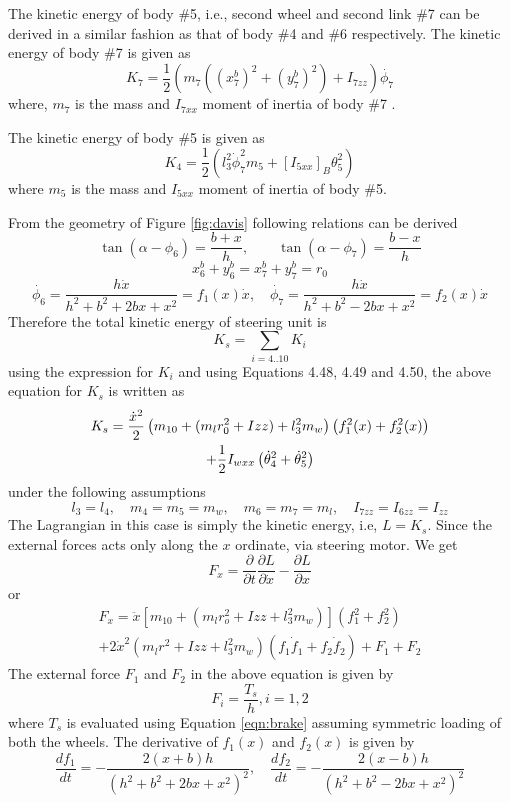 The kinetic energy of body \#5, i.e., second wheel and second link \#7 can be derived in a similar fashion as that of body \#4 and \#6 respectively. The kinetic energy of body \#7 is given as
\begin{equation}
K_7=\frac{1}{2}(m_7((x^b_7)^2+(y^b_7)^2)+I_{7zz})\dot{\phi_7}
\end{equation}
where, $m_7$ is the mass and  $I_{7xx}$ moment of inertia of body \#7 .

The kinetic energy of body \#5  is given as
 \begin{equation}
K_4=\frac{1}{2}(l_3^2\dot\phi_7^2m_5+[I_{5xx}]_B\theta_5^2)
\end{equation} 
 where $m_5$  is the mass and $I_{5xx}$ moment of inertia of body \#5.
 

From the geometry of Figure \ref{fig:davis} following relations can be derived 
\begin{equation}
\label{eqn:thetaTox}
\tan(\alpha-\phi_6)=\frac{b+x}{h}, \quad \quad \tan(\alpha-\phi_7)=\frac{b-x}{h}
\end{equation}
\begin{equation}
\label{ro}
x^b_6+y^b_6=x^b_7+y^b_7=r_0
\end{equation}
\begin{equation}
\dot{\phi_6}=\dfrac{h\dot x}{h^2+b^2+2bx+x^2}=f_1(x)\dot x,\quad \dot{\phi_7}=\dfrac{h\dot x}{h^2+b^2-2bx+x^2}=f_2(x)\dot x
\end{equation}
 Therefore the total kinetic energy of steering unit is 
\[K_s=\sum_{i=4..10}K_i\]
using the expression for $K_i$  and using Equations 4.48, 4.49 and 4.50, the above equation for $K_s$  is written as 
\begin{multline}
	K_s=\frac{\dot x^2}{2} \left( m_{10}+(m_l r^2_0+I{zz})+l^2_3m_w \right) \left(f^2_1(x)+f^2_2(x) \right)\\ + \frac{1}{2} I_{wxx}\left(\dot\theta^2_4  +\dot\theta^2_5\right)
\end{multline}
under the following assumptions \[l_3=l_4, \quad m_4=m_5=m_w, \quad m_6=m_7=m_l, \quad I_{7zz}=I_{6zz}=I_{zz}\]
The Lagrangian in this case is simply the kinetic energy, i.e,  $L=K_s$. Since the external forces acts only along the $x$ ordinate, via steering motor. We get
\[F_x= \dfrac{\partial}{\partial t}\dfrac{\partial L}{\partial \dot x} - \dfrac{\partial L}{\partial x}\]
or 
\begin{multline}
\label{eqn:SteerDyn}
F_x=\ddot{x}\left[ m_{10}+\left(m_lr_o^2+I{zz}+l^2_3m_w \right) \right] \left( f_1^2+f_2^2 \right)\\
+2\dot x^2 \left(m_lr^2+I{zz}+l_3^2 m_w \right) \left( f_1 \dot f_1 +f_2 \dot f_2\right)+F_1+F_2
\end{multline}
The external force $F_1$ and $F_2$ in the above equation is given by
\[F_i=\dfrac{T_s}{h},i={1,2} \]
where $T_s$ is evaluated using Equation \ref{eqn:brake} assuming symmetric loading of both the wheels. The derivative of $f_1(x)$ and  $f_2(x)$ is given by 
\[ \dfrac{df_1}{dt}=-\dfrac{2(x+b)h}{(h^2+b^2+2bx+x^2)^2}, \quad \dfrac{df_2}{dt}=-\dfrac{2(x-b)h}{(h^2+b^2-2bx+x^2)^2}\]



